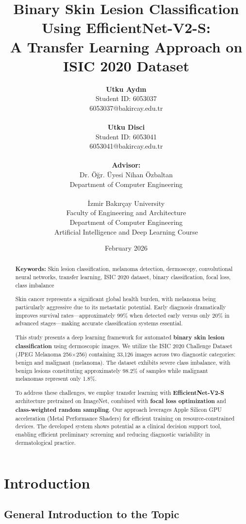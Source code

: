 \documentclass[12pt,a4paper]{article}
\title{\textbf{Binary Skin Lesion Classification Using EfficientNet-V2-S:}\\\textbf{A Transfer Learning Approach on ISIC 2020 Dataset}}
\author{
\textbf{Utku Aydın}\\
Student ID: 6053037\\
6053037@bakircay.edu.tr\\
\\
\textbf{Utku Disci}\\
Student ID: 6053041\\
6053041@bakircay.edu.tr\\
\\
\textbf{Advisor:}\\
Dr. Öğr. Üyesi Nihan Özbaltan\\
Department of Computer Engineering\\
\\
İzmir Bakırçay University\\
Faculty of Engineering and Architecture\\
Department of Computer Engineering\\
Artificial Intelligence and Deep Learning Course
}
\date{February 2026}
\begin{document}
\maketitle

\begin{abstract}
\noindent\textbf{Keywords:} Skin lesion classification, melanoma detection, dermoscopy, convolutional neural networks, transfer learning, ISIC 2020 dataset, binary classification, focal loss, class imbalance

\vspace{0.5cm}

Skin cancer represents a significant global health burden, with melanoma being particularly aggressive due to its metastatic potential. Early diagnosis dramatically improves survival rates---approximately 99\% when detected early versus only 20\% in advanced stages---making accurate classification systems essential.

This study presents a deep learning framework for automated \textbf{binary skin lesion classification} using dermoscopic images. We utilize the ISIC 2020 Challenge Dataset (JPEG Melanoma 256$\times$256) containing 33,126 images across two diagnostic categories: benign and malignant (melanoma). The dataset exhibits severe class imbalance, with benign lesions constituting approximately 98.2\% of samples while malignant melanomas represent only 1.8\%.

To address these challenges, we employ transfer learning with \textbf{EfficientNet-V2-S} architecture pretrained on ImageNet, combined with \textbf{focal loss optimization} and \textbf{class-weighted random sampling}. Our approach leverages Apple Silicon GPU acceleration (Metal Performance Shaders) for efficient training on resource-constrained devices. The developed system shows potential as a clinical decision support tool, enabling efficient preliminary screening and reducing diagnostic variability in dermatological practice.
\end{abstract}

\newpage

\section{Introduction}

\subsection{General Introduction to the Topic}
\end{document}

